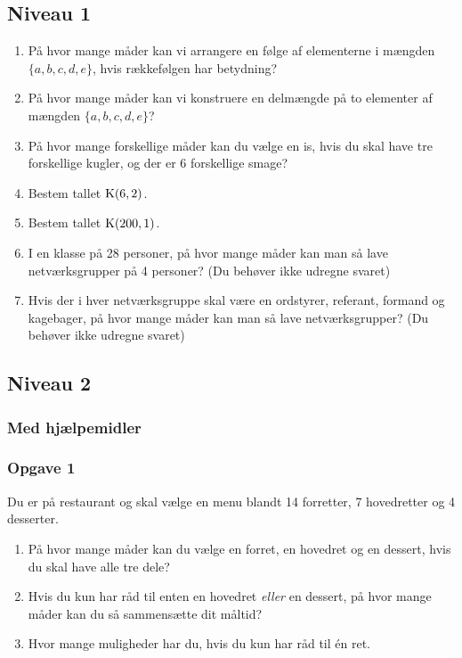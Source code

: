 \subsection*{Niveau 1}

\begin{enumerate}[label=\roman*)]
	\item På hvor mange måder kan vi arrangere en følge af elementerne i mængden $\{a,b,c,d,e\}$, hvis rækkefølgen har betydning?
	\item På hvor mange måder kan vi konstruere en delmængde på to elementer af mængden $\{a,b,c,d,e\}$?
	\item På hvor mange forskellige måder kan du vælge en is, hvis du skal have tre forskellige kugler, og der er 6 forskellige smage?
	\item Bestem tallet $\textnormal{K}(6,2)$.
	\item Bestem tallet $\textnormal{K}(200,1)$.
	\item I en klasse på 28 personer, på hvor mange måder kan man så lave netværksgrupper på 4 personer? (Du behøver ikke udregne svaret)
	\item Hvis der i hver netværksgruppe skal være en ordstyrer, referant, formand og kagebager, på hvor mange måder kan man så lave netværksgrupper? (Du behøver ikke udregne svaret)
\end{enumerate}

\subsection*{Niveau 2}

\subsubsection*{Med hjælpemidler}

\subsubsection*{Opgave 1}
Du er på restaurant og skal vælge en menu blandt 14 forretter, 7 hovedretter og 4 desserter.
\begin{enumerate}[label=\roman*)]
	\item På hvor mange måder kan du vælge en forret, en hovedret og en dessert, hvis du skal have alle tre dele?
	\item Hvis du kun har råd til enten en hovedret \textit{eller} en dessert, på hvor mange måder kan du så sammensætte dit måltid?
	\item Hvor mange muligheder har du, hvis du kun har råd til én ret. 
\end{enumerate}

